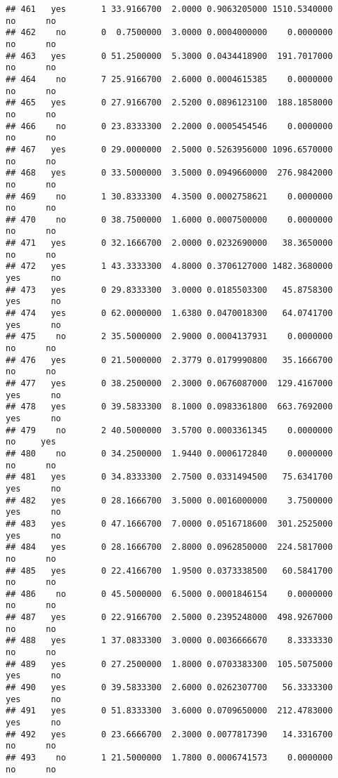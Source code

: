 \documentclass[]{article}
\begin{document}
\begin{verbatim}
## 461   yes       1 33.9166700  2.0000 0.9063205000 1510.5340000    no      no
## 462    no       0  0.7500000  3.0000 0.0004000000    0.0000000    no      no
## 463   yes       0 51.2500000  5.3000 0.0434418900  191.7017000    no      no
## 464    no       7 25.9166700  2.6000 0.0004615385    0.0000000    no      no
## 465   yes       0 27.9166700  2.5200 0.0896123100  188.1858000    no      no
## 466    no       0 23.8333300  2.2000 0.0005454546    0.0000000    no      no
## 467   yes       0 29.0000000  2.5000 0.5263956000 1096.6570000    no      no
## 468   yes       0 33.5000000  3.5000 0.0949660000  276.9842000    no      no
## 469    no       1 30.8333300  4.3500 0.0002758621    0.0000000    no      no
## 470    no       0 38.7500000  1.6000 0.0007500000    0.0000000    no      no
## 471   yes       0 32.1666700  2.0000 0.0232690000   38.3650000    no      no
## 472   yes       1 43.3333300  4.8000 0.3706127000 1482.3680000   yes      no
## 473   yes       0 29.8333300  3.0000 0.0185503300   45.8758300   yes      no
## 474   yes       0 62.0000000  1.6380 0.0470018300   64.0741700   yes      no
## 475    no       2 35.5000000  2.9000 0.0004137931    0.0000000    no      no
## 476   yes       0 21.5000000  2.3779 0.0179990800   35.1666700    no      no
## 477   yes       0 38.2500000  2.3000 0.0676087000  129.4167000   yes      no
## 478   yes       0 39.5833300  8.1000 0.0983361800  663.7692000   yes      no
## 479    no       2 40.5000000  3.5700 0.0003361345    0.0000000    no     yes
## 480    no       0 34.2500000  1.9440 0.0006172840    0.0000000    no      no
## 481   yes       0 34.8333300  2.7500 0.0331494500   75.6341700   yes      no
## 482   yes       0 28.1666700  3.5000 0.0016000000    3.7500000   yes      no
## 483   yes       0 47.1666700  7.0000 0.0516718600  301.2525000   yes      no
## 484   yes       0 28.1666700  2.8000 0.0962850000  224.5817000    no      no
## 485   yes       0 22.4166700  1.9500 0.0373338500   60.5841700    no      no
## 486    no       0 45.5000000  6.5000 0.0001846154    0.0000000    no      no
## 487   yes       0 22.9166700  2.5000 0.2395248000  498.9267000    no      no
## 488   yes       1 37.0833300  3.0000 0.0036666670    8.3333330    no      no
## 489   yes       0 27.2500000  1.8000 0.0703383300  105.5075000   yes      no
## 490   yes       0 39.5833300  2.6000 0.0262307700   56.3333300   yes      no
## 491   yes       0 51.8333300  3.6000 0.0709650000  212.4783000   yes      no
## 492   yes       0 23.6666700  2.3000 0.0077817390   14.3316700    no      no
## 493    no       1 21.5000000  1.7800 0.0006741573    0.0000000    no      no

\end{verbatim}
\end{document}
